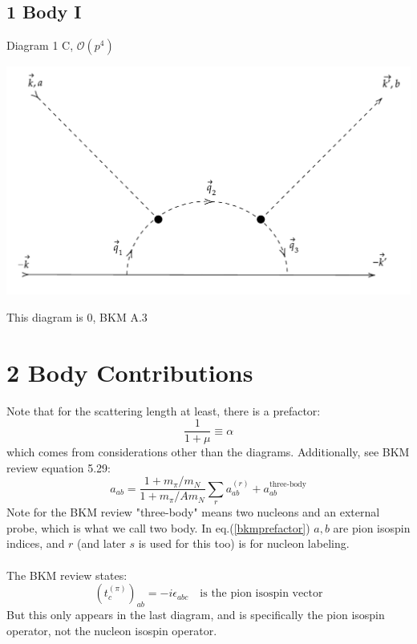\documentclass[11pt]{article}
\newcommand\mo{\mathcal{O}}
\begin{document}
\subsection{1 Body I}
Diagram 1 C, $\mo(p^4)$
\begin{center}
    \includegraphics[scale=0.6]{1i.pdf}
\end{center}
This diagram is $0$, BKM A.3
\newpage
\section{2 Body Contributions}
Note that for the scattering length at least, there is a prefactor:
\begin{equation}
    \frac{1}{1+\mu} \equiv \alpha
\end{equation}
which comes from considerations other than the diagrams. Additionally, see BKM review equation 5.29:
\begin{equation}
    a_{ab}= \frac{1+ m_\pi/m_N}{1+m_\pi/Am_N} \sum_r a^{(r)}_{ab} + a^{\text{three-body}}_{ab}\label{bkmprefactor}
\end{equation}
Note for the BKM review "three-body" means two nucleons and an external probe, which is what we call two body.
In eq.(\ref{bkmprefactor}) $a,b$ are pion isospin indices, and $r$ (and later $s$ is used for this too) is for nucleon labeling. \\~\\

The BKM review states:
\begin{equation}
    (t_c^{(\pi)})_{ab}= -i \epsilon_{abc}\quad\text{is the pion isospin vector}
\end{equation}
But this only appears in the last diagram, and is specifically the pion isospin operator, not the nucleon isospin operator.
\end{document}
